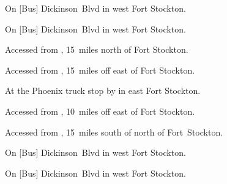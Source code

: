 

\begin{LocationList}

On [Bus] Dickinson~Blvd in west Fort Stockton.

\Location{\GarageHQ \Garage}
On [Bus] Dickinson~Blvd in west Fort Stockton.

Accessed from , 15~miles north of Fort Stockton.

Accessed from , 15~miles off  east of Fort Stockton.

At the Phoenix truck stop by   in east Fort Stockton.

Accessed from , 10~miles off  east of Fort Stockton.

Accessed from , 15~miles south of  north of Fort~Stockton.

On [Bus] Dickinson~Blvd in west Fort Stockton.

On [Bus] Dickinson~Blvd in west Fort Stockton.

\end{LocationList}
